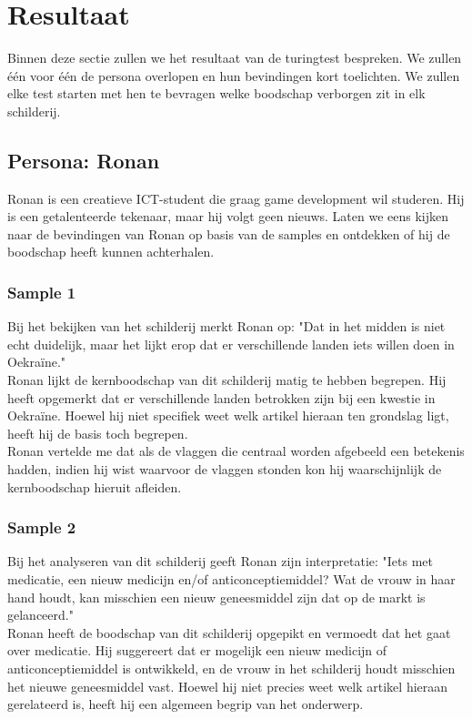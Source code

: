 \section{Resultaat}
\label{section:result}
Binnen deze sectie zullen we het resultaat van de turingtest bespreken. We zullen één voor één de persona overlopen en hun bevindingen kort toelichten. We zullen elke test starten met hen te bevragen welke boodschap verborgen zit in elk schilderij.

\subsection{Persona: Ronan}
Ronan is een creatieve ICT-student die graag game development wil studeren. Hij is een getalenteerde tekenaar, maar hij volgt geen nieuws. Laten we eens kijken naar de bevindingen van Ronan op basis van de samples en ontdekken of hij de boodschap heeft kunnen achterhalen.

\subsubsection{Sample 1}
Bij het bekijken van het schilderij merkt Ronan op: "Dat in het midden is niet echt duidelijk, maar het lijkt erop dat er verschillende landen iets willen doen in Oekraïne." \\

Ronan lijkt de kernboodschap van dit schilderij matig te hebben begrepen. Hij heeft opgemerkt dat er verschillende landen betrokken zijn bij een kwestie in Oekraïne. Hoewel hij niet specifiek weet welk artikel hieraan ten grondslag ligt, heeft hij de basis toch begrepen.  \\

Ronan vertelde me dat als de vlaggen die centraal worden afgebeeld een betekenis hadden, indien hij wist waarvoor de vlaggen stonden kon hij waarschijnlijk de kernboodschap hieruit afleiden. 
 
\subsubsection{Sample 2}
Bij het analyseren van dit schilderij geeft Ronan zijn interpretatie: "Iets met medicatie, een nieuw medicijn en/of anticonceptiemiddel? Wat de vrouw in haar hand houdt, kan misschien een nieuw geneesmiddel zijn dat op de markt is gelanceerd." \\

Ronan heeft de boodschap van dit schilderij opgepikt en vermoedt dat het gaat over medicatie. Hij suggereert dat er mogelijk een nieuw medicijn of anticonceptiemiddel is ontwikkeld, en de vrouw in het schilderij houdt misschien het nieuwe geneesmiddel vast. Hoewel hij niet precies weet welk artikel hieraan gerelateerd is, heeft hij een algemeen begrip van het onderwerp. \\
  
